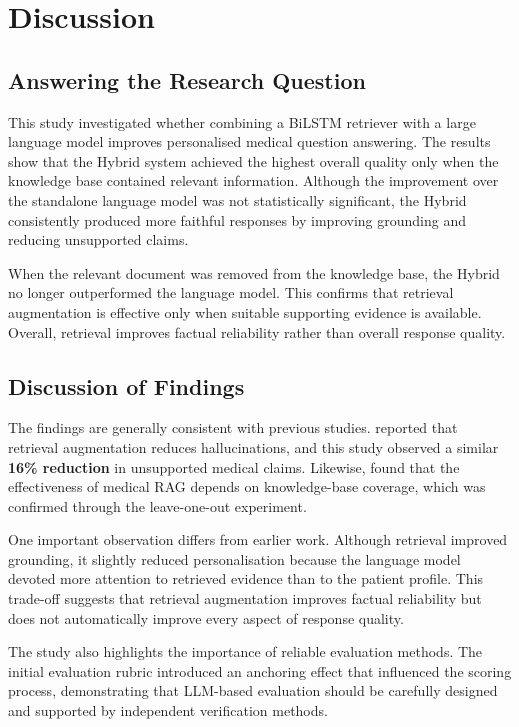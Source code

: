 \section{Discussion}
\label{sec:Discussion}

\subsection{Answering the Research Question}

This study investigated whether combining a BiLSTM retriever with a large language model improves personalised medical question answering. The results show that the Hybrid system achieved the highest overall quality only when the knowledge base contained relevant information. Although the improvement over the standalone language model was not statistically significant, the Hybrid consistently produced more faithful responses by improving grounding and reducing unsupported claims.

When the relevant document was removed from the knowledge base, the Hybrid no longer outperformed the language model. This confirms that retrieval augmentation is effective only when suitable supporting evidence is available. Overall, retrieval improves factual reliability rather than overall response quality.

\subsection{Discussion of Findings}

The findings are generally consistent with previous studies. \citet{shuster2021} reported that retrieval augmentation reduces hallucinations, and this study observed a similar \textbf{16\% reduction} in unsupported medical claims. Likewise, \citet{xiong2024} found that the effectiveness of medical RAG depends on knowledge-base coverage, which was confirmed through the leave-one-out experiment.

One important observation differs from earlier work. Although retrieval improved grounding, it slightly reduced personalisation because the language model devoted more attention to retrieved evidence than to the patient profile. This trade-off suggests that retrieval augmentation improves factual reliability but does not automatically improve every aspect of response quality.

The study also highlights the importance of reliable evaluation methods. The initial evaluation rubric introduced an anchoring effect that influenced the scoring process, demonstrating that LLM-based evaluation should be carefully designed and supported by independent verification methods.

